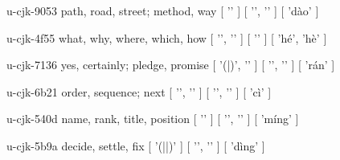 \begin{multicols}{2}
\cjkgGlue{} u-cjk-9053  path, road, street; method, way  [ '\cjkgGlue{}' ]  [ '\cjkgGlue{}', '\cjkgGlue{}' ]  [ 'dào' ] 

\cjkgGlue{} u-cjk-4f55  what, why, where, which, how  [ '\cjkgGlue{}', '\cjkgGlue{}' ]  [ '\cjkgGlue{}' ]  [ 'hé', 'hè' ] 

\cjkgGlue{} u-cjk-7136  yes, certainly; pledge, promise  [ '\cjkgGlue{}(\cjkgGlue{}|\cjkgGlue{})', '\cjkgGlue{}' ]  [ '\cjkgGlue{}', '\cjkgGlue{}' ]  [ 'rán' ] 

\cjkgGlue{} u-cjk-6b21  order, sequence; next  [ '\cjkgGlue{}', '\cjkgGlue{}' ]  [ '\cjkgGlue{}', '\cjkgGlue{}' ]  [ 'cì' ] 

\cjkgGlue{} u-cjk-540d  name, rank, title, position  [ '\cjkgGlue{}' ]  [ '\cjkgGlue{}', '\cjkgGlue{}' ]  [ 'míng' ] 

\cjkgGlue{} u-cjk-5b9a  decide, settle, fix  [ '\cjkgGlue{}(\cjkgGlue{}|\cjkgGlue{}|\cjkgGlue{})' ]  [ '\cjkgGlue{}', '\cjkgGlue{}' ]  [ 'dìng' ] 


\end{multicols}
